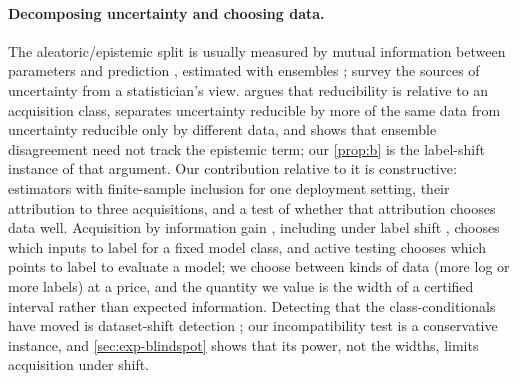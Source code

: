 \documentclass[twoside]{article}
\begin{document}
\paragraph{Decomposing uncertainty and choosing data.} The aleatoric/epistemic split
\citep{hullermeier2021aleatoric} is usually measured by mutual information between parameters and
prediction \citep{depeweg2018decomposition}, estimated with ensembles \citep{lakshminarayanan2017simple};
\citet{gruber2023sources} survey the sources of uncertainty from a statistician's view.
\citet{young2026epistemic} argues that reducibility is relative to an acquisition class, separates
uncertainty reducible by more of the same data from uncertainty reducible only by different data,
and shows that ensemble disagreement need not track the epistemic term; our \cref{prop:b} is the
label-shift instance of that argument. Our contribution relative to it is constructive: estimators
with finite-sample inclusion for one deployment setting, their attribution to three acquisitions,
and a test of whether that attribution chooses data well. Acquisition by information gain \citep{houlsby2011bayesian}, including under label shift
\citep{zhao2021active}, chooses which inputs to label for a fixed model class, and active testing
\citep{kossen2021active} chooses which points to label to evaluate a model; we choose between kinds of
data (more log or more labels) at a price, and the quantity we value is the width of a certified
interval rather than expected information. Detecting that the class-conditionals have moved is
dataset-shift detection \citep{rabanser2019failing}; our incompatibility test is a conservative instance,
and \cref{sec:exp-blindspot} shows that its power, not the widths, limits acquisition under shift.
\end{document}
